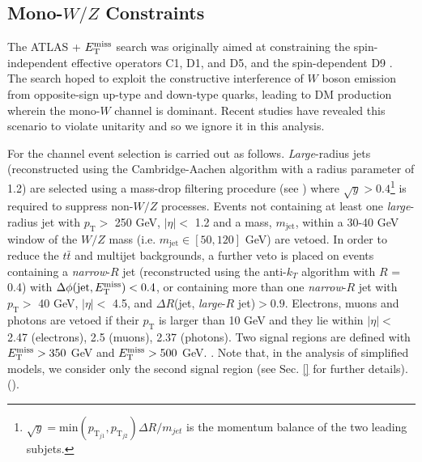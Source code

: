 \subsection{Mono-$W/Z$ Constraints}
\label{monoWZ_constraints}

The ATLAS \monoWZ + $E_{\mathrm{T}}^{\mathrm{miss}}$ search was originally aimed at constraining the spin-independent effective operators C1, D1, and D5, and the spin-dependent D9 \cite{}. The search hoped to exploit the constructive interference of $W$ boson emission from opposite-sign up-type and down-type quarks, leading to DM production wherein the mono-$W$ channel is dominant. Recent studies have revealed this scenario to violate unitarity and so we ignore it in this analysis.
%

For the \monoWZ channel event selection is carried out as follows. \textit{Large}-radius jets (reconstructed using the Cambridge-Aachen algorithm with a radius parameter of 1.2) are selected using a mass-drop filtering procedure (see \cite{}) where $\sqrt{y}>0.4$\footnote{$\sqrt{y} = \mathrm{min}(p_{\mathrm{T}_{j1}},p_{\mathrm{T}_{j2}})\Delta R / m_{jet}$ is the momentum balance of the two leading subjets.} is required to suppress non-$W/Z$ processes. Events not containing at least one \textit{large}-radius jet with $p_{\mathrm{T}} >$ 250 GeV, $|\eta| <$ 1.2 and a mass, $m_{\mathrm{jet}}$, within a 30-40 GeV window of the $W/Z$ mass (i.e. $m_{\mathrm{jet}} \in [50, 120]$ GeV) are vetoed. In order to reduce the $t \bar{t}$ and multijet backgrounds, a further veto is placed on events containing a \textit{narrow}-$R$ jet (reconstructed using the anti-$k_T$ algorithm with $R$ = 0.4) with $\Delta\phi(\mathrm{jet},E_{\mathrm{T}}^{\mathrm{miss}})< 0.4$, or containing more than one \textit{narrow}-$R$ jet with $p_{\mathrm{T}} >$ 40 GeV, $|\eta| <$ 4.5, and $\Delta R$(jet, \textit{large}-$R$ jet)$>0.9$. Electrons, muons and photons are vetoed if their $p_{\mathrm{T}}$ is larger than 10 GeV and they lie within $|\eta| <$ 2.47 (electrons), 2.5 (muons), 2.37 (photons). Two signal regions are defined with $E_{\mathrm{T}}^{\mathrm{miss}} > 350$ GeV and $E_{\mathrm{T}}^{\mathrm{miss}} > 500$ GeV. . Note that, in the analysis of simplified models, we consider only the second signal region (see Sec. \ref{} for further details). ().

